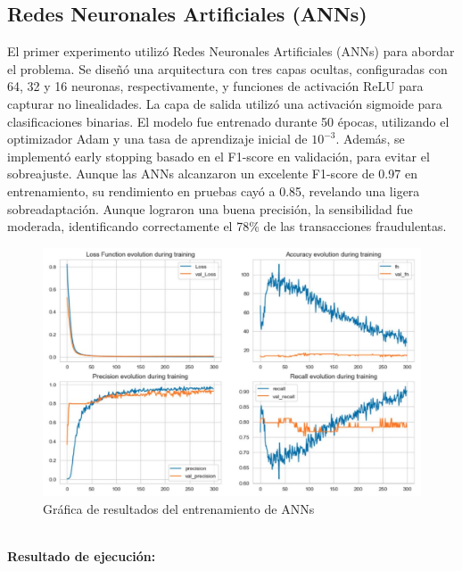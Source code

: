 \documentclass[9pt,a4paper,twoside]{rho-class/rho}
\begin{document}
        \subsection{Redes Neuronales Artificiales (ANNs)}
            El primer experimento utilizó Redes Neuronales Artificiales (ANNs) para abordar el problema. Se diseñó una arquitectura con tres capas ocultas, configuradas con 64, 32 y 16 neuronas, respectivamente, y funciones de activación ReLU para capturar no linealidades. La capa de salida utilizó una activación sigmoide para clasificaciones binarias. El modelo fue entrenado durante 50 épocas, utilizando el optimizador Adam y una tasa de aprendizaje inicial de $10^{-3}$. Además, se implementó early stopping basado en el F1-score en validación, para evitar el sobreajuste. Aunque las ANNs alcanzaron un excelente F1-score de 0.97 en entrenamiento, su rendimiento en pruebas cayó a 0.85, revelando una ligera sobreadaptación. Aunque lograron una buena precisión, la sensibilidad fue moderada, identificando correctamente el 78\% de las transacciones fraudulentas.
            \begin{figure}[h]
                \centering
                \includegraphics[width=\linewidth]{figures/resultados_ann.pdf}
                \caption{Gráfica de resultados del entrenamiento de ANNs}
                \label{fig:sample_figure}
            \end{figure}\\
            \textbf{Resultado de ejecución:}\\
\small
\end{document}
